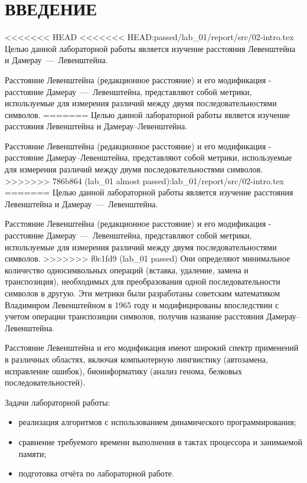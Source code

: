 \section*{ВВЕДЕНИЕ}

<<<<<<< HEAD
<<<<<<< HEAD:passed/lab_01/report/src/02-intro.tex
Целью данной лабораторной работы является изучение расстояния Левенштейна и Дамерау~---~Левенштейна.

Расстояние Левенштейна (редакционное расстояние) и его модификация - расстояние Дамерау~---~Левенштейна, представляют собой метрики, используемые для измерения различий между двумя последовательностями символов.
=======
Целью данной лабораторной работы является изучение расстояния Левенштейна и Дамерау--Левенштейна.

Расстояние Левенштейна (редакционное расстояние) и его модификация - расстояние Дамерау--Левенштейна, представляют собой метрики, используемые для измерения различий между двумя последовательностями символов.
>>>>>>> 786b864 (lab_01 almost passed):lab_01/report/src/02-intro.tex
=======
Целью данной лабораторной работы является изучение расстояния Левенштейна и Дамерау~---~Левенштейна.

Расстояние Левенштейна (редакционное расстояние) и его модификация - расстояние Дамерау~---~Левенштейна, представляют собой метрики, используемые для измерения различий между двумя последовательностями символов.
>>>>>>> f0c1fd9 (lab_01 passed)
Они определяют минимальное количество односимвольных операций (вставка, удаление, замена и транспозиция), необходимых для преобразования одной последовательности символов в другую.
Эти метрики были разработаны советским математиком Владимиром Левенштейном в 1965 году и модифицированы впоследствии с учетом операции транспозиции символов, получив название расстояния Дамерау--Левенштейна.

Расстояние Левенштейна и его модификация имеют широкий спектр применений в различных областях, включая компьютерную лингвистику (автозамена, исправление ошибок), биоинформатику (анализ генома, белковых последовательностей).

Задачи лабораторной работы:
\begin{itemize}
    \item реализация алгоритмов с использованием динамического программирования;
    \item сравнение требуемого времени выполнения в тактах процессора и занимаемой памяти;
    \item подготовка отчёта по лабораторной работе.
\end{itemize}

